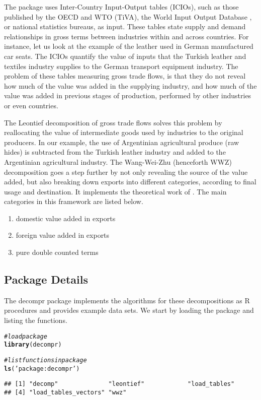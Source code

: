 \documentclass[a4paper]{article}\usepackage[]{graphicx}\usepackage[]{color}
\makeatletter
\newcommand{\hlstr}[1]{\textcolor[rgb]{0.192,0.494,0.8}{#1}}%
\newcommand{\hlcom}[1]{\textcolor[rgb]{0.678,0.584,0.686}{\textit{#1}}}%
\newcommand{\hlstd}[1]{\textcolor[rgb]{0.345,0.345,0.345}{#1}}%
\newcommand{\hlkwd}[1]{\textcolor[rgb]{0.737,0.353,0.396}{\textbf{#1}}}%
\newenvironment{kframe}{%
 \def\at@end@of@kframe{}%
 \ifinner\ifhmode%
  \def\at@end@of@kframe{\end{minipage}}%
  \begin{minipage}{\columnwidth}%
 \fi\fi%
 \def\FrameCommand##1{\hskip\@totalleftmargin \hskip-\fboxsep
 \colorbox{shadecolor}{##1}\hskip-\fboxsep
     \hskip-\linewidth \hskip-\@totalleftmargin \hskip\columnwidth}%
 \MakeFramed {\advance\hsize-\width
   \@totalleftmargin\z@ \linewidth\hsize
   \@setminipage}}%
 {\par\unskip\endMakeFramed%
 \at@end@of@kframe}
\newenvironment{knitrout}{}{} %
\makeatother
\begin{document}
The package uses Inter-Country Input-Output tables (ICIOs), such as
those published by the OECD and WTO (TiVA), the World Input Output
Database \citep{timmer2012world}, or national statistics bureaus,
as input. These tables state supply and demand relationships in gross
terms between industries within and across countries. For instance,
let us look at the example of the leather used in German manufactured
car seats. The ICIOs quantify the value of inputs that the Turkish
leather and textiles industry supplies to the German transport equipment
industry. The problem of these tables measuring gross trade flows,
is that they do not reveal how much of the value was added in the
supplying industry, and how much of the value was added in previous
stages of production, performed by other industries or even countries.

The Leontief decomposition of gross trade flows solves this problem
by reallocating the value of intermediate goods used by industries
to the original producers. In our example, the use of Argentinian
agricultural produce (raw hides) is subtracted from the Turkish leather
industry and added to the Argentinian agricultural industry. The Wang-Wei-Zhu
(henceforth WWZ) decomposition goes a step further by not only revealing
the source of the value added, but also breaking down exports into
different categories, according to final usage and destination. It
implements the theoretical work of \citet{wang2014quantifying}. The
main categories in this framework are listed below.
\begin{enumerate}
\item domestic value added in exports 
\item foreign value added in exports 
\item pure double counted terms 
\end{enumerate}

\subsection{Package Details}

The decompr package implements the algorithms for these decompositions
as R procedures and provides example data sets. We start by loading
the package and listing the functions.

\begin{knitrout}
\color{fgcolor}\begin{kframe}
\begin{alltt}
\hlcom{# load package}
\hlkwd{library}\hlstd{(decompr)}

\hlcom{# list functions in package}
\hlkwd{ls}\hlstd{(}\hlstr{'package:decompr'}\hlstd{)}
\end{alltt}
\begin{verbatim}
## [1] "decomp"              "leontief"            "load_tables"        
## [4] "load_tables_vectors" "wwz"
\end{verbatim}
\end{kframe}
\end{knitrout}
\end{document}
